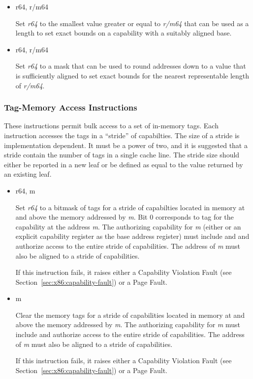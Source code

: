 \begin{itemize}
  \item {} r64, r/m64

    Set \emph{r64} to the smallest value greater or equal to
    \emph{r/m64} that can be used as a length to set exact bounds on a
    capability with a suitably aligned base.

  \item {} r64, r/m64

    Set \emph{r64} to a mask that can be used to round addresses down
    to a value that is sufficiently aligned to set exact bounds for
    the nearest representable length of \emph{r/m64}.
\end{itemize}

\subsubsection{Tag-Memory Access Instructions}

These instructions permit bulk access to a set of in-memory tags.
Each instruction accesses the tags in a ``stride'' of capabilties.
The size of a stride is implementation dependent.  It must be a power
of two, and it is suggested that a stride contain the number of tags
in a single cache line.  The stride size should either be reported in
a new  leaf or be defined as equal to the value
returned by an existing  leaf.

\begin{itemize}
  \item {} r64, m

    Set \emph{r64} to a bitmask of tags for a stride of capabilties
    located in memory at and above the memory addressed by \emph{m}.
    Bit 0 corresponds to tag for the capability at the address
    \emph{m}.  The authorizing capability for \emph{m} (either \DDC{}
    or an explicit capability register as the base address register)
    must include \cappermL{} and \cappermLC{} and authorize access to
    the entire stride of capabilities.  The address of \emph{m} must
    also be aligned to a stride of capabilities.

    If this instruction fails, it raises either a Capability Violation
    Fault (see Section~\ref{sec:x86:capability-fault}) or a Page
    Fault.

  \item {} m

    Clear the memory tags for a stride of capabilities located in
    memory at and above the memory addressed by \emph{m}.  The
    authorizing capability for \emph{m} must include \cappermS{} and
    authorize access to the entire stride of
    capabilities.  The address of \emph{m} must also be aligned to a
    stride of capabilities.

    If this instruction fails, it raises either a Capability Violation
    Fault (see Section~\ref{sec:x86:capability-fault}) or a Page
    Fault.
\end{itemize}

